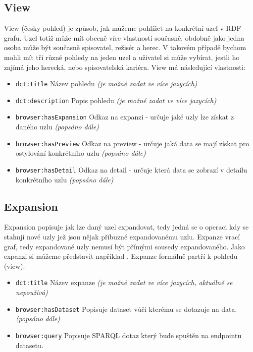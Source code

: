 \subsection{View}
View (česky pohled) je způsob, jak můžeme pohlížet na konkrétní uzel v RDF grafu. Uzel totiž může mít obecně více vlastností současně, obdobně jako jedna osoba může být současně spisovatel, režisér a herec. V takovém případě bychom mohli mít tři různé pohledy na jeden uzel a uživatel si může vybírat, jestli ho zajímá jeho herecká, nebo spisovatelská kariéra. View má následující vlastnosti:

\begin{itemize}
    \item \texttt{dct:title} Název pohledu \textit{(je možné zadat ve více jazycích)}
    \item \texttt{dct:description} Popis pohledu \textit{(je možné zadat ve více jazycích)}
    \item \texttt{browser:hasExpansion} Odkaz na expanzi - určuje jaké uzly lze získat z daného uzlu \textit{(popsáno dále)}
    \item \texttt{browser:hasPreview} Odkaz na preview - určuje jaká data se mají získat pro ostylování konkrétního uzlu \textit{(popsáno dále)}
    \item \texttt{browser:hasDetail} Odkaz na detail - určuje která data se zobrazí v detailu konkrétního uzlu \textit{(popsáno dále)}
\end{itemize}

\subsection{Expansion} \label{pozadavky-expansion}
Expansion popisuje jak lze daný uzel expandovat, tedy jedná se o operaci kdy se stahují nové uzly jež jsou nějak příbuzné expandovanému uzlu. Expanze vrací graf, tedy expandované uzly nemusí být přímými sousedy expandovaného. Jako expanzi si můžeme představit například . Expanze formálně partří k pohledu (view).
\begin{itemize}
    \item \texttt{dct:title} Název expanze \textit{(je možné zadat ve více jazycích, aktuálně se nepoužívá)}
    \item \texttt{browser:hasDataset} Popisuje dataset vůči kterému se dotazuje na data. \textit{(popsáno dále)}
    \item \texttt{browser:query} Popisuje SPARQL dotaz který bude spuštěn na endpointu datasetu.
\end{itemize}

